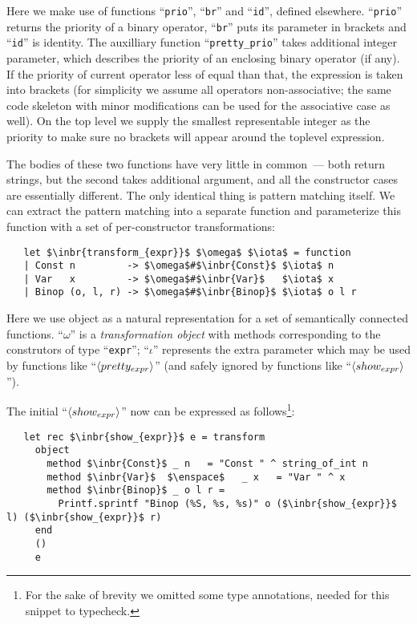 Here we make use of functions ``\lstinline{prio}'', ``\lstinline{br}'' and ``\lstinline{id}'', defined elsewhere. ``\lstinline{prio}''
returns the priority of a binary operator, ``\lstinline{br}'' puts its parameter in brackets and ``\lstinline{id}''
is identity. The auxilliary function ``\lstinline{pretty_prio}'' takes additional integer parameter, which describes the priority of an enclosing
binary operator (if any). If the priority of current operator less of equal than that, the expression is taken into brackets (for simplicity we assume all
operators non-associative; the same code skeleton with minor modifications can be used for the associative case as well). On the top level we supply the
smallest representable integer as the priority to make sure no brackets will appear around the toplevel expression.

The bodies of these two functions have very little in common~--- both return strings, but the second takes additional argument, and all the constructor cases
are essentially different. The only identical thing is pattern matching itself. We can extract the pattern matching into a separate function and parameterize this
function with a set of per-constructor transformations:

\begin{lstlisting}
   let $\inbr{transform_{expr}}$ $\omega$ $\iota$ = function
   | Const n         -> $\omega$#$\inbr{Const}$ $\iota$ n
   | Var   x         -> $\omega$#$\inbr{Var}$   $\iota$ x
   | Binop (o, l, r) -> $\omega$#$\inbr{Binop}$ $\iota$ o l r
\end{lstlisting}

Here we use object as a natural representation for a set of semantically connected functions. ``$\omega$'' is a \emph{transformation object} with methods corresponding to
the construtors of type ``\lstinline{expr}''; ``$\iota$'' represents the extra parameter which may be used by functions like ``$\left<pretty_{expr}\right>$'' (and safely
ignored by functions like ``$\left<show_{expr}\right>$'').

The initial ``$\left<show_{expr}\right>$'' now can be expressed as follows\footnote{For the sake of brevity we omitted some type annotations, needed for this snippet to typecheck.}:

\begin{lstlisting}
   let rec $\inbr{show_{expr}}$ e = transform
     object
       method $\inbr{Const}$ _ n   = "Const " ^ string_of_int n
       method $\inbr{Var}$  $\enspace$   _ x   = "Var " ^ x
       method $\inbr{Binop}$ _ o l r =
         Printf.sprintf "Binop (%S, %s, %s)" o ($\inbr{show_{expr}}$ l) ($\inbr{show_{expr}}$ r)
     end
     ()
     e
\end{lstlisting}

